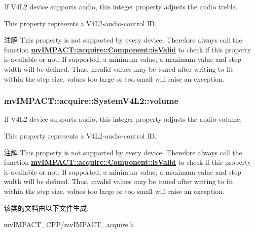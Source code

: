 If V4\+L2 device supports audio, this integer property adjusts the audio treble. 

This property represents a V4\+L2-\/audio-\/control I\+D.

\begin{DoxyNote}{注解}
This property is not supported by every device. Therefore always call the function {\bfseries \hyperlink{classmv_i_m_p_a_c_t_1_1acquire_1_1_component_ac51e55e7e046101f3c6119d84123abd5}{mv\+I\+M\+P\+A\+C\+T\+::acquire\+::\+Component\+::is\+Valid}} to check if this property is available or not. If supported, a minimum value, a maximum value and step width will be defined. Thus, invalid values may be tuned after writing to fit within the step size, values too large or too small will raise an exception. 
\end{DoxyNote}
\hypertarget{classmv_i_m_p_a_c_t_1_1acquire_1_1_system_v4_l2_a82bfb9912fe48b47fa7aef6ebbd8f6ed}{
\subsubsection[{volume}]{ mv\+I\+M\+P\+A\+C\+T\+::acquire\+::\+System\+V4\+L2\+::volume}}\label{classmv_i_m_p_a_c_t_1_1acquire_1_1_system_v4_l2_a82bfb9912fe48b47fa7aef6ebbd8f6ed}


If V4\+L2 device supports audio, this integer property adjusts the audio volume. 

This property represents a V4\+L2-\/audio-\/control I\+D.

\begin{DoxyNote}{注解}
This property is not supported by every device. Therefore always call the function {\bfseries \hyperlink{classmv_i_m_p_a_c_t_1_1acquire_1_1_component_ac51e55e7e046101f3c6119d84123abd5}{mv\+I\+M\+P\+A\+C\+T\+::acquire\+::\+Component\+::is\+Valid}} to check if this property is available or not. If supported, a minimum value, a maximum value and step width will be defined. Thus, invalid values may be tuned after writing to fit within the step size, values too large or too small will raise an exception. 
\end{DoxyNote}


该类的文档由以下文件生成\+:\begin{DoxyCompactItemize}
\item 
mv\+I\+M\+P\+A\+C\+T\+\_\+\+C\+P\+P/mv\+I\+M\+P\+A\+C\+T\+\_\+acquire.\+h\end{DoxyCompactItemize}
